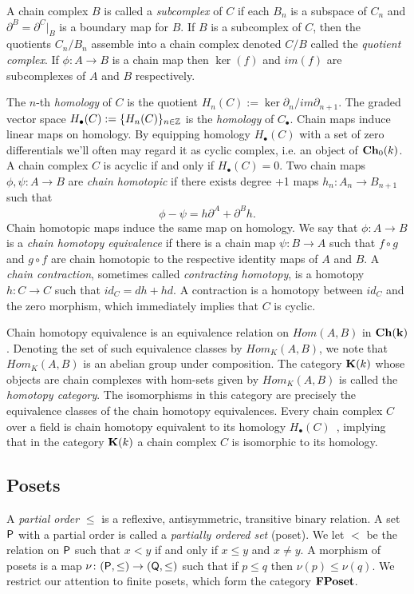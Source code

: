 A chain complex $B$ is called a {\em subcomplex} of $C$ if each $B_n$ is a subspace of $C_n$ and $\partial^B= \partial^C |_B$ is a boundary map for $B$.    
If $B$ is a subcomplex of $C$, then the quotients $C_n/B_n$ assemble into a chain complex denoted $C/B$ called the {\em quotient complex}.   If $\phi\colon A\to B$ is a chain map then $\ker(f)$ and $im(f)$ are subcomplexes of $A$ and $B$ respectively.

The $n$-th \emph{homology} of $C$ is the quotient $H_n(C):= \ker \partial_n/im \partial_{n+1}$.  The graded vector space $H_\bullet(C) := \{H_n(C)\}_{n\in {\mathbb{Z}}}$ is the {\em homology} of $C_\bullet$.  Chain maps induce linear maps on homology.  By equipping homology $H_\bullet(C)$ with a set of zero differentials we'll often may regard it as cyclic complex, i.e. an object of ${\bf Ch}_0(k)$.   A chain complex $C$ is acyclic if and only if $H_\bullet(C)=0$.   Two chain maps $\phi,\psi \colon A\to B$ are {\em chain homotopic} if there exists degree +1 maps $h_n\colon A_n\to B_{n+1}$ such that 
\[
\phi-\psi = h\partial^A+\partial^Bh.
\]  
Chain homotopic maps induce the same map on homology.    We say that $\phi \colon A\to B$ is a {\em chain homotopy equivalence} if there is a chain map $\psi \colon B\to A$ such that $f\circ g$ and $g\circ f$ are chain homotopic to the respective identity maps of $A$ and $B$.  A {\em chain contraction}, sometimes called {\em contracting homotopy}, is a homotopy $h:C\to C$ such that $id_C = dh+hd$.  A contraction is a homotopy between $id_C$ and the zero morphism, which immediately implies that $C$ is cyclic.

Chain homotopy equivalence is an equivalence relation on $Hom(A,B)$ in ${\bf Ch(k)}$.  
Denoting the set of  such equivalence classes by $Hom_K(A,B)$, we note that $Hom_K(A,B)$ is an abelian group under composition.  
The category ${\bf K}(k)$ whose objects are chain complexes with hom-sets given by $Hom_K(A,B)$ is called the \emph{homotopy category}.  
The isomorphisms in this category are precisely the equivalence classes of the chain homotopy equivalences.  Every chain complex $C$ over a field is chain homotopy equivalent to its homology $H_\bullet (C)$~\cite{weibel}, implying that in the category ${\bf K}(k)$ a chain complex $C$ is isomorphic to its homology.


\subsection{Posets}
A \emph{partial order} $\leq$ is a reflexive, antisymmetric, transitive binary relation.
A set ${\mathsf P}$ with a partial order is called a \emph{partially ordered set} (poset).  We let $<$ be the relation on ${\mathsf P}$ such that $x<y$ if and only if $x\leq y$ and $x\neq y$.
A morphism of posets is a map $\nu \colon({\mathsf P},\leq)\to ({\mathsf Q},\leq)$ such that if $p\leq q$ then $\nu(p)\leq \nu(q)$.  
We restrict our attention to finite posets, which form the category ${\bf FPoset}$.  

